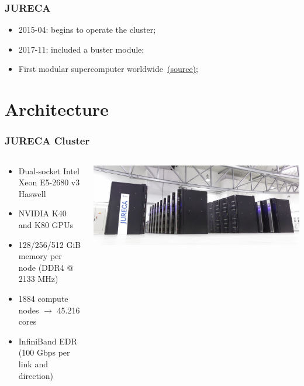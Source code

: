 \documentclass{beamer}
\begin{document}
\begin{frame}
  \frametitle{JURECA}
  \begin{itemize}
    \item 2015-04: begins to operate the cluster;
    \item 2017-11: included a buster module;
    \item First modular supercomputer worldwide~\href{https://www.fz-juelich.de/SharedDocs/Pressemitteilungen/UK/EN/2017/2017-11-13-jureca-booster.html}{(source)};
  \end{itemize}
\end{frame}


\section{Architecture}

\begin{frame}
  \frametitle{JURECA Cluster}
  \begin{columns}[T]
    \begin{column}{.5\textwidth}
      \begin{itemize}
        \item Dual-socket Intel Xeon E5-2680 v3 Haswell
        \item NVIDIA K40 and K80 GPUs
        \item 128/256/512 GiB memory per node (DDR4 @ 2133 MHz)
        \item 1884 compute nodes $\to$ 45.216 cores
        \item InfiniBand EDR (100 Gbps per link and direction)
      \end{itemize}
    \end{column}
    \begin{column}{.5\textwidth}
      \includegraphics[width=\textwidth]{./images/jureca-cluster.jpeg}
    \end{column}
  \end{columns}
\end{frame}
\end{document}
